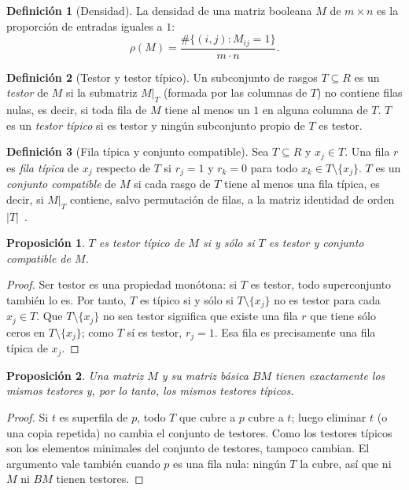 \documentclass[11pt, a4paper]{article}
\theoremstyle{definition}
\newtheorem{definicion}{Definición}
\theoremstyle{plain}
\newtheorem{proposicion}{Proposición}
\newcommand{\x}[1]{x_{#1}}
\begin{document}
\begin{definicion}[Densidad]
La densidad de una matriz booleana $M$ de $m\times n$ es la proporción de
entradas iguales a $1$:
\[
  \rho(M)=\frac{\#\{(i,j): M_{ij}=1\}}{m\cdot n}.
\]
\end{definicion}

\begin{definicion}[Testor y testor típico]
Un subconjunto de rasgos $T\subseteq R$ es un \emph{testor} de $M$ si la
submatriz $M|_T$ (formada por las columnas de $T$) no contiene filas nulas, es
decir, si toda fila de $M$ tiene al menos un $1$ en alguna columna de $T$.
$T$ es un \emph{testor típico} si es testor y ningún subconjunto propio de $T$
es testor.
\end{definicion}

\begin{definicion}[Fila típica y conjunto compatible]
Sea $T\subseteq R$ y $\x j\in T$. Una fila $r$ es \emph{fila típica} de $\x j$
respecto de $T$ si $r_j=1$ y $r_k=0$ para todo $\x k\in T\setminus\{\x j\}$.
$T$ es un \emph{conjunto compatible} de $M$ si cada rasgo de $T$ tiene al
menos una fila típica, es decir, si $M|_T$ contiene, salvo permutación de
filas, a la matriz identidad de orden $|T|$~\cite{yyc2014}.
\end{definicion}

\begin{proposicion}\label{prop:tipico}
$T$ es testor típico de $M$ si y sólo si $T$ es testor y conjunto compatible de $M$.
\end{proposicion}
\begin{proof}
Ser testor es una propiedad monótona: si $T$ es testor, todo superconjunto
también lo es. Por tanto, $T$ es típico si y sólo si $T\setminus\{\x j\}$ no es
testor para cada $\x j\in T$. Que $T\setminus\{\x j\}$ no sea testor significa
que existe una fila $r$ que tiene sólo ceros en $T\setminus\{\x j\}$; como $T$
sí es testor, $r_j=1$. Esa fila es precisamente una fila típica de $\x j$.
\end{proof}

\begin{proposicion}\label{prop:basica}
Una matriz $M$ y su matriz básica $BM$ tienen exactamente los mismos testores
y, por lo tanto, los mismos testores típicos.
\end{proposicion}
\begin{proof}
Si $t$ es superfila de $p$, todo $T$ que cubre a $p$ cubre a $t$; luego
eliminar $t$ (o una copia repetida) no cambia el conjunto de testores. Como los
testores típicos son los elementos minimales del conjunto de testores, tampoco
cambian. El argumento vale también cuando $p$ es una fila nula: ningún $T$ la
cubre, así que ni $M$ ni $BM$ tienen testores.
\end{proof}
\end{document}
